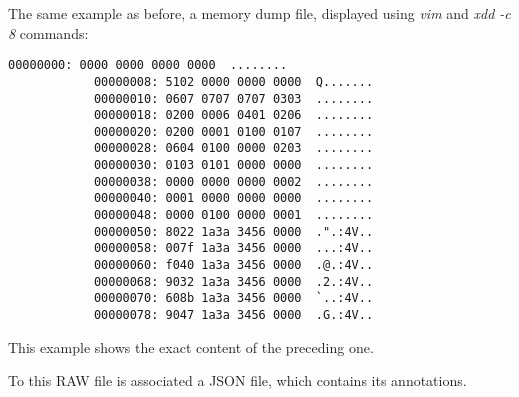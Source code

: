     \begin{minipage}{\dimexpr\linewidth-20pt}
        The same example as before, a memory dump file, displayed using \textit{vim} and \textit{xdd -c 8} commands:

        \begin{lstlisting}[style=hexdump, caption={Hex Dump}]
            00000000: 0000 0000 0000 0000  ........
            00000008: 5102 0000 0000 0000  Q.......
            00000010: 0607 0707 0707 0303  ........
            00000018: 0200 0006 0401 0206  ........
            00000020: 0200 0001 0100 0107  ........
            00000028: 0604 0100 0000 0203  ........
            00000030: 0103 0101 0000 0000  ........
            00000038: 0000 0000 0000 0002  ........
            00000040: 0001 0000 0000 0000  ........
            00000048: 0000 0100 0000 0001  ........
            00000050: 8022 1a3a 3456 0000  .".:4V..
            00000058: 007f 1a3a 3456 0000  ...:4V..
            00000060: f040 1a3a 3456 0000  .@.:4V..
            00000068: 9032 1a3a 3456 0000  .2.:4V..
            00000070: 608b 1a3a 3456 0000  `..:4V..
            00000078: 9047 1a3a 3456 0000  .G.:4V..
        \end{lstlisting}
    \end{minipage}

    This example shows the exact content of the preceding one. 

    To this RAW file is associated a JSON file, which contains its annotations.  


